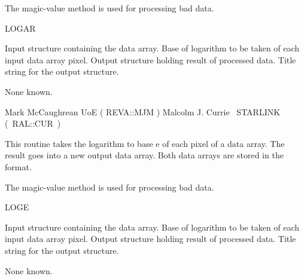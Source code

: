 {\begin{manroutinedescription}
  The magic-value method is used for processing bad data.

  LOGAR

\begin{manparametertable}
  Input {} structure containing the data array.
  Base of logarithm to be taken of each input data array pixel.
  Output {} structure holding result of processed data.
  Title string for the output {} structure. \mbox{}
\end{manparametertable}
  None known.

  Mark McCaughrean UoE ( {\mantt REVA}::{\mantt MJM} )
  Malcolm J. Currie ~STARLINK \mbox{( {\mantt RAL}::{\mantt CUR} )}
\end{manroutinedescription}

\begin{manroutinedescription}
  This routine takes the logarithm to base e of each pixel of
  a data array. The result goes into a new output data array.
  Both data arrays are stored in the {} format.

  The magic-value method is used for processing bad data.

  LOGE

\begin{manparametertable}
  Input {} structure containing the data array.
  Base of logarithm to be taken of each input data array pixel. {\mantt [2.718282]}
  Output {} structure holding result of processed data.
  Title string for the output {} structure. \mbox{}
\end{manparametertable}
  None known.


\end{manroutinedescription}}
